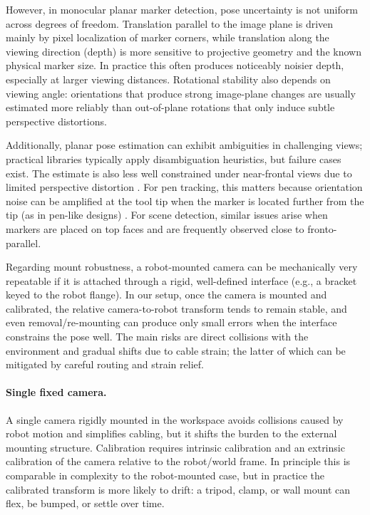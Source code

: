 However, in monocular planar marker detection, pose uncertainty is not uniform across degrees of freedom. Translation parallel to the image plane is driven mainly by pixel localization of marker corners, while translation along the viewing direction (depth) is more sensitive to projective geometry and the known physical marker size. In practice this often produces noticeably noisier depth, especially at larger viewing distances. Rotational stability also depends on viewing angle: orientations that produce strong image-plane changes are usually estimated more reliably than out-of-plane rotations that only induce subtle perspective distortions.

Additionally, planar pose estimation can exhibit ambiguities in challenging views; practical libraries typically apply disambiguation heuristics, but failure cases exist. The estimate is also less well constrained under near-frontal views due to limited perspective distortion \cite{Rijlaarsdam2022}. For pen tracking, this matters because orientation noise can be amplified at the tool tip when the marker is located further from the tip (as in pen-like designs) \cite{dpoint_github}. For scene detection, similar issues arise when markers are placed on top faces and are frequently observed close to fronto-parallel.

Regarding mount robustness, a robot-mounted camera can be mechanically very repeatable if it is attached through a rigid, well-defined interface (e.g., a bracket keyed to the robot flange). In our setup, once the camera is mounted and calibrated, the relative camera-to-robot transform tends to remain stable, and even removal/re-mounting can produce only small errors when the interface constrains the pose well. The main risks are direct collisions with the environment and gradual shifts due to cable strain; the latter of which can be mitigated by careful routing and strain relief.

\paragraph{Single fixed camera.}
A single camera rigidly mounted in the workspace avoids collisions caused by robot motion and simplifies cabling, but it shifts the burden to the external mounting structure. Calibration requires intrinsic calibration and an extrinsic calibration of the camera relative to the robot/world frame. In principle this is comparable in complexity to the robot-mounted case, but in practice the calibrated transform is more likely to drift: a tripod, clamp, or wall mount can flex, be bumped, or settle over time.

